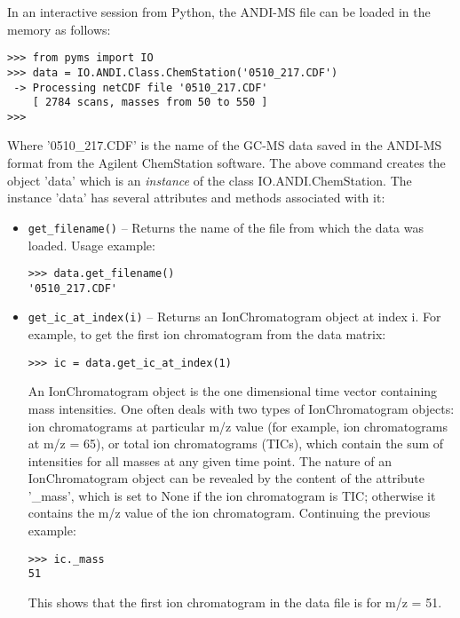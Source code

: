 In an interactive session from Python, the ANDI-MS file can be loaded
in the memory as follows:

\begin{verbatim}
>>> from pyms import IO
>>> data = IO.ANDI.Class.ChemStation('0510_217.CDF')
 -> Processing netCDF file '0510_217.CDF'
    [ 2784 scans, masses from 50 to 550 ]
>>>
\end{verbatim}

Where '0510\_217.CDF' is the name of the GC-MS data saved in the ANDI-MS
format from the Agilent ChemStation software.  The above command creates
the object 'data' which is an {\em instance} of the class IO.ANDI.ChemStation.
The instance 'data' has several attributes and methods associated with it:

\begin{itemize}

\item {\tt get\_filename()} -- Returns the name of the file from which
the data was loaded. Usage example:

\begin{verbatim}
>>> data.get_filename()
'0510_217.CDF'
\end{verbatim}

\item {\tt get\_ic\_at\_index(i)} -- Returns an IonChromatogram object
at index i.  For example, to get the first ion chromatogram from the data
matrix:

\begin{verbatim}
>>> ic = data.get_ic_at_index(1)
\end{verbatim}

\noindent
An IonChromatogram object is the one dimensional time vector containing
mass intensities.  One often deals with two types of IonChromatogram
objects: ion chromatograms at particular m/z value (for example, ion
chromatograms at m/z = 65), or total ion chromatograms (TICs), which
contain the sum of intensities for all masses at any given time point. 
The nature of an IonChromatogram object can be revealed by the content
of the attribute '\_mass', which is set to None if the ion chromatogram
is TIC; otherwise it contains the m/z value of the ion chromatogram.
Continuing the previous example:

\begin{verbatim}
>>> ic._mass
51
\end{verbatim}

\noindent
This shows that the first ion chromatogram in the data file is for
m/z = 51.


\end{itemize}
